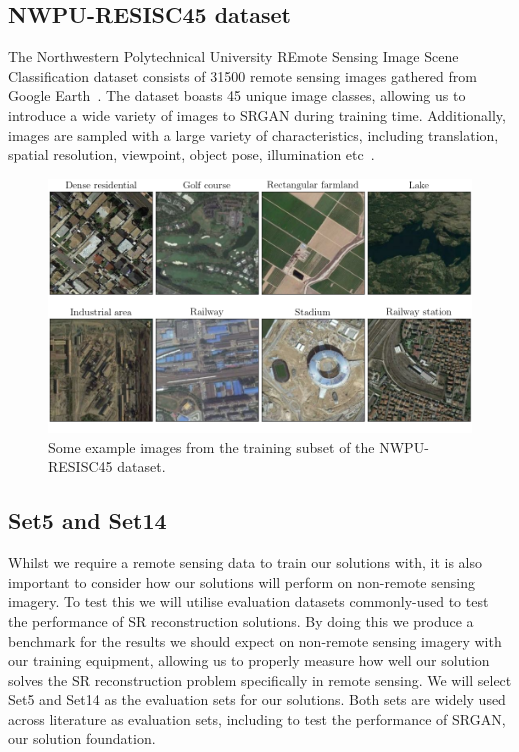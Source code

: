 \subsection{NWPU-RESISC45 dataset}\label{subsec:resisc45}
The Northwestern Polytechnical University REmote Sensing Image Scene Classification dataset consists of 31500 remote sensing images gathered from Google Earth~\cite{resisc45}. The dataset boasts 45 unique image classes, allowing us to introduce a wide variety of images to SRGAN during training time. Additionally, images are sampled with a large variety of characteristics, including translation, spatial resolution, viewpoint, object pose, illumination etc~\cite{resisc45}.
\begin{figure}
    \includegraphics[width=\linewidth]{./assets/resisc45_example.png}
    \caption{Some example images from the training subset of the NWPU-RESISC45 dataset.}
    \label{fig:resisc45_examples}
\end{figure}

\subsection{Set5 and Set14}
Whilst we require a remote sensing data to train our solutions with, it is also important to consider how our solutions will perform on non-remote sensing imagery. To test this we will utilise evaluation datasets commonly-used to test the performance of SR reconstruction solutions. By doing this we produce a benchmark for the results we should expect on non-remote sensing imagery with our training equipment, allowing us to properly measure how well our solution solves the SR reconstruction problem specifically in remote sensing. We will select Set5 and Set14 as the evaluation sets for our solutions. Both sets are widely used across literature as evaluation sets, including to test the performance of SRGAN, our solution foundation.

